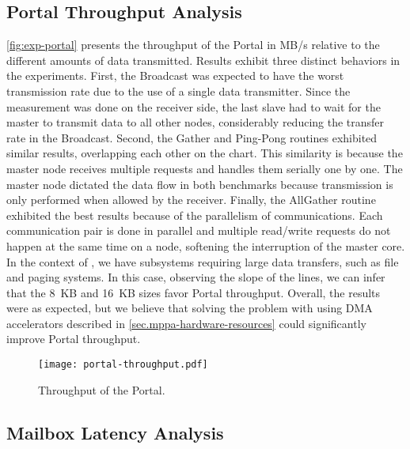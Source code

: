 		\subsection{Portal Throughput Analysis}

			\autoref{fig:exp-portal} presents the throughput of the Portal in MB/s
			relative to the different amounts of data transmitted. Results exhibit
			three distinct behaviors in the experiments. First, the Broadcast was
			expected to have the worst transmission rate due to the use of a single
			data transmitter. Since the measurement was done on the receiver side,
			the last slave had to wait for the master to transmit data to all other nodes,
			considerably reducing the transfer rate in the Broadcast. Second, the
			Gather and Ping-Pong routines exhibited similar results, overlapping
			each other on the chart. This similarity is because the master node
			receives multiple requests and handles them serially one by one.
			The master node dictated the data flow in both benchmarks because
			transmission is only performed when allowed by the receiver. Finally,
			the AllGather routine exhibited the best results because of the
			parallelism of communications. Each communication pair is done in parallel
			and multiple read/write requests do not happen at the same time on a node,
			softening the interruption of the master core. In the context of \oss,
			we have subsystems requiring large data transfers, such as file and
			paging systems. In this case, observing the slope of the lines,
			we can infer that the 8~KB and 16~KB sizes favor Portal throughput.
			Overall, the results were as expected, but we believe that solving
			the problem with using DMA accelerators described in
			\autoref{sec.mppa-hardware-resources} could significantly improve
			Portal throughput.

			\begin{figure}[!tb]
				\centering%
				\caption{Throughput of the Portal.}%
				\label{fig:exp-portal}%
				\texttt{[image: portal-throughput.pdf]}%
			\end{figure}

		\subsection{Mailbox Latency Analysis}

